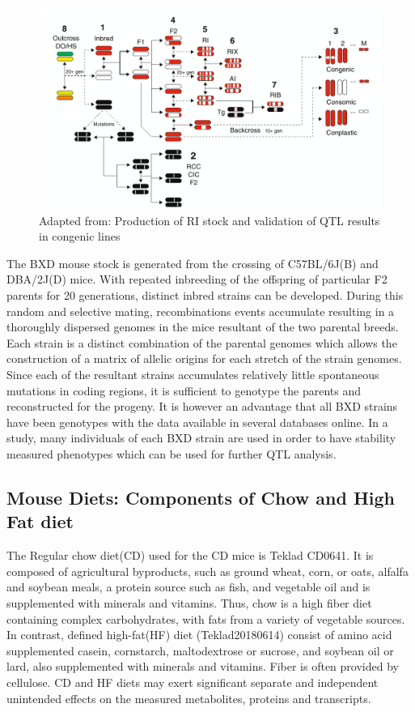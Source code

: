 \documentclass[a4paper,11pt,twoside]{book}
\begin{document}
	\begin{figure}
		\centering
		\includegraphics[width=\linewidth]{1.Introduction_Figures/BXDs.png}
		\caption{Adapted from:\citep{Williams2017ResourcesGenetics} Production of RI stock and validation of QTL results in congenic lines}
	\end{figure}
	
	The BXD mouse stock is generated from the crossing of C57BL/6J(B) and DBA/2J(D) mice. With repeated inbreeding of the offspring of particular F2 parents for 20 generations, distinct inbred strains can be developed. During this random and selective mating, recombinations events accumulate resulting in a thoroughly dispersed genomes in the mice resultant of the two parental breeds. Each strain is a distinct combination of the parental genomes which allows the construction of a matrix of allelic origins for each stretch of the strain genomes. Since each of the resultant strains accumulates relatively little spontaneous mutations in coding regions, it is sufficient to genotype the parents and reconstructed for the progeny. It is however an advantage that all BXD strains have been genotypes with the data available in several databases online.  In a study, many individuals of each BXD strain are used in order to have stability measured phenotypes which can be used for further QTL analysis. 
	
	\subsection{Mouse Diets: Components of Chow and High Fat diet}
	
	The Regular chow diet(CD) used for the CD mice is Teklad CD0641. It is composed of agricultural byproducts, such as ground wheat, corn, or oats, alfalfa and soybean meals, a protein source such as fish, and vegetable oil and is supplemented with minerals and vitamins. Thus, chow is a high fiber diet containing complex carbohydrates, with fats from a variety of vegetable sources. In contrast, defined high-fat(HF) diet (Teklad20180614) consist of amino acid supplemented casein, cornstarch, maltodextrose or sucrose, and soybean oil or lard, also supplemented with minerals and vitamins. Fiber is often provided by cellulose. CD and HF diets may exert significant separate and independent unintended effects on the measured metabolites, proteins and transcripts.
	
\end{document}
